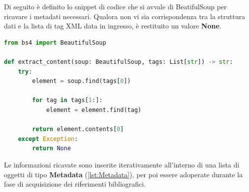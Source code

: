 Di seguito è definito lo snippet di codice che si avvale di BeatifulSoup per ricavare i metadati necessari. Qualora non vi sia corrispondenza tra la struttura dati e la lista di tag XML data in ingresso, è restituito un valore \textbf{None}.
\begin{lstlisting}[language=python, caption=Estrazione dell'informazioni tramite BeatifulSoup]
from bs4 import BeautifulSoup

def extract_content(soup: BeautifulSoup, tags: List[str]) -> str:
    try:
        element = soup.find(tags[0])

        for tag in tags[1:]:
            element = element.find(tag)

        return element.contents[0]
    except Exception:
        return None\end{lstlisting}
Le informazioni ricavate sono inserite iterativamente all'interno di una lista di oggetti di tipo \textbf{Metadata} (\ref{lst:Metadata}), per poi essere adoperate durante la fase di acquisizione dei riferimenti bibliografici.